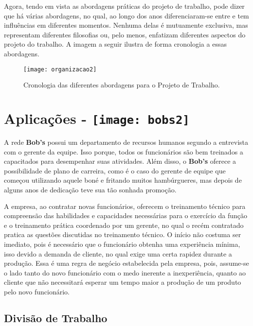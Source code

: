 		Agora, tendo em vista as abordagens práticas do projeto de trabalho, pode dizer que há várias abordagens, no qual, ao longo dos anos diferenciaram-se entre e tem influências em diferentes momentos. Nenhuma delas é mutuamente exclusiva, mas representam diferentes filosofias ou, pelo menos, enfatizam diferentes aspectos do projeto do trabalho. A imagem a seguir ilustra de forma cronologia a essas abordagens.

		\begin{figure}[h]
			\centering
			\texttt{[image: organizacao2]}
			\caption[Cronologia das diferentes abordagens para o Projeto de Trabalho]{Cronologia das diferentes abordagens para o Projeto de Trabalho. \cite{slack}}
			\label{fig:organizacao2}
		\end{figure}

	\section[Aplicações]{Aplicações - \texttt{[image: bobs2]}}
	\label{sec:organizacao_aplicacoes}

		A rede \textbf{Bob’s} possui um departamento de recursos humanos segundo a entrevista com o gerente da equipe. Isso porque, todos os funcionários são bem treinados a capacitados para desempenhar suas atividades. Além disso, o \textbf{Bob’s} oferece a possibilidade de plano de carreira, como é o caso do gerente de equipe que começou utilizando aquele boné e fritando muitos hambúrgueres, mas depois de alguns anos de dedicação teve sua tão sonhada promoção. 
		
		A empresa, ao contratar novas funcionários, oferecem o treinamento técnico para compreensão das habilidades e capacidades necessárias para o exercício da função e o treinamento prática coordenado por um gerente, no qual o recém contratado pratica as questões discutidas no treinamento técnico. O início não costuma ser imediato, pois é necessário que o funcionário obtenha uma experiência mínima, isso devido a demanda de cliente, no qual exige uma certa rapidez durante a produção. Essa é uma regra de negócio estabelecida pela empresa, pois, assume-se o lado tanto do novo funcionário com o medo inerente a inexperiência, quanto ao cliente que não necessitará esperar um tempo maior a produção de um produto pelo novo funcionário.

		\subsection[Divisão de Trabalho]{Divisão de Trabalho}
		\label{sec:organizacao_dt}

